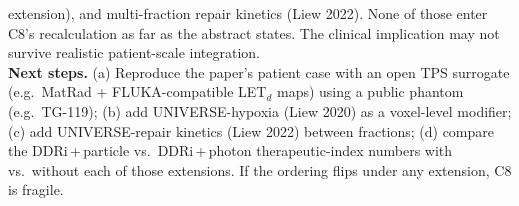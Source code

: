 \documentclass[11pt]{article}
\begin{document}
\begin{description}
        extension), and multi-fraction repair kinetics (Liew 2022). None of those enter C8's
        recalculation as far as the abstract states. The clinical implication may not survive
        realistic patient-scale integration.\\
        \textbf{Next steps.} (a) Reproduce the paper's patient case with an open TPS surrogate
        (e.g.\ MatRad + FLUKA-compatible LET$_d$ maps) using a public phantom (e.g.\ TG-119); (b)
        add UNIVERSE-hypoxia (Liew 2020) as a voxel-level modifier; (c) add UNIVERSE-repair
        kinetics (Liew 2022) between fractions; (d) compare the DDRi\,+\,particle vs.\
        DDRi\,+\,photon therapeutic-index numbers with vs.\ without each of those extensions.
        If the ordering flips under any extension, C8 is fragile.
\end{description}
\end{document}
